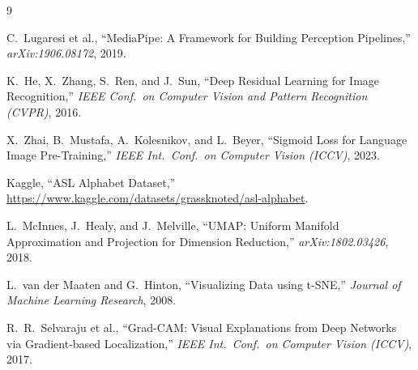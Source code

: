 \documentclass[11pt,a4paper]{article}
\begin{document}
\begin{thebibliography}{9}

C.\ Lugaresi et al.,
``MediaPipe: A Framework for Building Perception Pipelines,''
\textit{arXiv:1906.08172}, 2019.

K.\ He, X.\ Zhang, S.\ Ren, and J.\ Sun,
``Deep Residual Learning for Image Recognition,''
\textit{IEEE Conf.\ on Computer Vision and Pattern Recognition (CVPR)}, 2016.

X.\ Zhai, B.\ Mustafa, A.\ Kolesnikov, and L.\ Beyer,
``Sigmoid Loss for Language Image Pre-Training,''
\textit{IEEE Int.\ Conf.\ on Computer Vision (ICCV)}, 2023.

Kaggle,
``ASL Alphabet Dataset,''
\url{https://www.kaggle.com/datasets/grassknoted/asl-alphabet}.

L.\ McInnes, J.\ Healy, and J.\ Melville,
``UMAP: Uniform Manifold Approximation and Projection for Dimension Reduction,''
\textit{arXiv:1802.03426}, 2018.

L.\ van der Maaten and G.\ Hinton,
``Visualizing Data using t-SNE,''
\textit{Journal of Machine Learning Research}, 2008.

R.\ R.\ Selvaraju et al.,
``Grad-CAM: Visual Explanations from Deep Networks via Gradient-based Localization,''
\textit{IEEE Int.\ Conf.\ on Computer Vision (ICCV)}, 2017.

\end{thebibliography}
\end{document}
